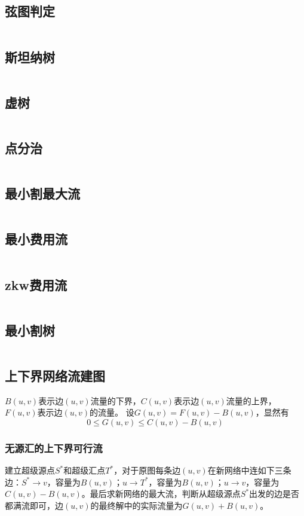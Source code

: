 \subsection{弦图判定}
\inputminted{cpp}{\source/graph-thery/judge.cpp}
\subsection{斯坦纳树}
\inputminted{cpp}{\source/graph-theory/Steiner-Tree.cpp}
\subsection{虚树}
\inputminted{cpp}{\source/graph-theory/mirage-tree.cpp}
\subsection{点分治}
\inputminted{cpp}{\source/graph-theory/vertex-partition.cpp}
\subsection{最小割最大流}
\inputminted{cpp}{\source/graph-theory/dinic.cpp}
\subsection{最小费用流}
\inputminted{cpp}{\source/graph-theory/mincost-maxflow.cpp}
\subsection{zkw费用流}
\inputminted{cpp}{\source/graph-theory/zkw-cost-flow.cpp}
\subsection{最小割树}
\inputminted{cpp}{\source/graph-theory/GH-tree.cpp}
\subsection{上下界网络流建图}
$B(u,v)$表示边$(u,v)$流量的下界，$C(u,v)$表示边$(u,v)$流量的上界，$F(u,v)$表示边$(u,v)$的流量。
设$G(u,v) = F(u,v) - B(u,v)$，显然有
$$0 \leq G(u,v) \leq C(u,v)-B(u,v)$$
\subsubsection{无源汇的上下界可行流}
建立超级源点$S^*$和超级汇点$T^*$，对于原图每条边$(u,v)$在新网络中连如下三条边：$S^* \rightarrow v$，容量为$B(u,v)$；$u \rightarrow T^*$，容量为$B(u,v)$；$u \rightarrow v$，容量为$C(u,v) - B(u,v)$。最后求新网络的最大流，判断从超级源点$S^*$出发的边是否都满流即可，边$(u,v)$的最终解中的实际流量为$G(u,v)+B(u,v)$。

